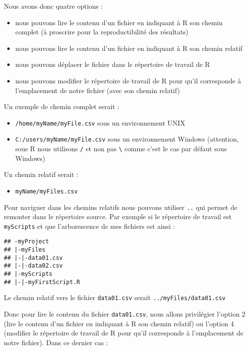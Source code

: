 \documentclass[]{book}
\providecommand{\tightlist}{%
  \setlength{\itemsep}{0pt}\setlength{\parskip}{0pt}}
\theoremstyle{definition}
\theoremstyle{definition}
\theoremstyle{definition}
\theoremstyle{remark}
\begin{document}
Nous avons donc quatre options :

\begin{itemize}
\tightlist
\item
  nous pouvons lire le contenu d'un fichier en indiquant à R son chemin
  complet (à proscrire pour la reproductibilité des résultats)
\item
  nous pouvons lire le contenu d'un fichier en indiquant à R son chemin
  relatif
\item
  nous pouvons déplacer le fichier dans le répertoire de travail de R
\item
  nous pouvons modifier le répertoire de travail de R pour qu'il
  corresponde à l'emplacement de notre fichier (avec son chemin relatif)
\end{itemize}

Un exemple de chemin complet serait :

\begin{itemize}
\tightlist
\item
  \texttt{/home/myName/myFile.csv} sous un environnement UNIX
\item
  \texttt{C:/users/myName/myFile.csv} sous un environnement Windows
  (attention, sous R nous utilisons \texttt{/} et non pas
  \texttt{\textbackslash{}} comme c'est le cas par défaut sous Windows)
\end{itemize}

Un chemin relatif serait :

\begin{itemize}
\tightlist
\item
  \texttt{myName/myFiles.csv}
\end{itemize}

Pour naviguer dans les chemins relatifs nous pouvons utiliser
\texttt{..} qui permet de remonter dans le répertoire source. Par
exemple si le répertoire de travail est \texttt{myScripts} et que
l'arborescence de mes fichiers est ainsi :

\begin{verbatim}
## -myProject
## |-myFiles
## |-|-data01.csv
## |-|-data02.csv
## |-myScripts
## |-|-myFirstScript.R
\end{verbatim}

Le chemin relatif vers le fichier \texttt{data01.csv} serait
\texttt{../myFiles/data01.csv}

Donc pour lire le contenu du fichier \texttt{data01.csv}, nous allons
privilégier l'option 2 (lire le contenu d'un fichier en indiquant à R
son chemin relatif) ou l'option 4 (modifier le répertoire de travail de
R pour qu'il corresponde à l'emplacement de notre fichier). Dans ce
dernier cas :
\end{document}
